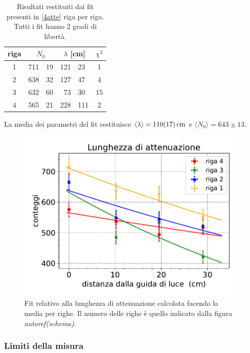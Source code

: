 \begin{table}[h]
\centering
\begin{tabular}{| c | r @{$\pm$} l  | r @{$\pm$} l  | c |}
\hline
riga & \multicolumn{2}{c|}{$N_0$} & \multicolumn{2}{c|}{ $\lambda$ [\si{cm}] } & $\chi^2$ \\
\hline
1 & 711&19 & 121&23 & 1\\
2 & 638&32 & 127&47 & 4\\
3 & 632&60 & 73&30 & 15\\
4 & 565&21 & 228&111 & 2\\
\hline
\end{tabular}
\caption{Risultati restituiti dai fit presenti in \autoref{4atte} riga per riga. Tutti i fit hanno 2 gradi di libertà.}
\label{tab:righe}
\end{table}


La media dei parametri del fit restituisce $\langle\lambda\rangle=\SI{110\pm17}{cm}$ e $\langle N_0\rangle=643\pm13$.
\begin{figure}[h]
\centering
\includegraphics[width=8 cm]{4atte}
\caption{Fit relativo alla lunghezza di attenuazione calcolata facendo la media per righe. Il numero delle righe è quello indicato dalla figura \emph{autoref(schema)}.}
\label{4atte}
\end{figure}


\subsubsection{Limiti della misura}

